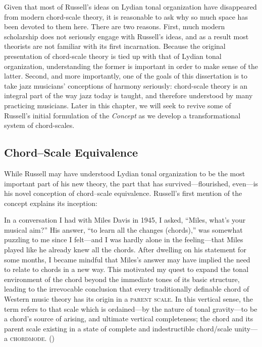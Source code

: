 Given that most of Russell's ideas on Lydian tonal organization have
disappeared from modern chord-scale theory, it is reasonable to ask why so
much space has been devoted to them here. There are two reasons. First, much
modern scholarship does not seriously engage with Russell's ideas, and as a
result most theorists are not familiar with its first incarnation. Because the
original presentation of chord-scale theory is tied up with that of Lydian
tonal organization, understanding the former is important in order to make
sense of the latter. Second, and more importantly, one of the goals of this
dissertation is to take jazz musicians' conceptions of harmony seriously:
chord-scale theory is an integral part of the way jazz today is taught, and
therefore understood by many practicing musicians. Later in this chapter, we
will seek to revive some of Russell's initial formulation of the
\emph{Concept} as we develop a transformational system of
chord-scales.

\subsection{Chord--Scale Equivalence}
\label{subsec:chord-scales}

While Russell may have understood Lydian tonal organization to be the most
important part of his new theory, the part that has survived---flourished,
even---is his novel conception of chord--scale equivalence.
Russell's first mention of the concept explains its inception:%
%
\begin{quoting}
  \singlespacing
  In a conversation I had with Miles Davis in 1945, I asked, ``Miles, what's
  your musical aim?'' His answer, ``to learn all the changes (chords),'' was
  somewhat puzzling to me since I felt---and I was hardly alone in the
  feeling---that Miles played like he already knew all the chords. After
  dwelling on his statement for some months, I became mindful that Miles's
  answer may have implied the need to relate to chords in a new way. This
  motivated my quest to expand the tonal environment of the chord beyond the
  immediate tones of its basic structure, leading to the irrevocable conclusion
  that every traditionally definable chord of Western music theory has its
  origin in a \textsc{parent scale}. In this vertical sense, the term refers to
  that scale which is ordained---by the nature of tonal gravity---to be a
  chord's source of arising, and ultimate vertical completeness; the chord and
  its parent scale existing in a state of complete and indestructible
  chord/scale unity---a \textsc{chordmode}. ()
\end{quoting}

